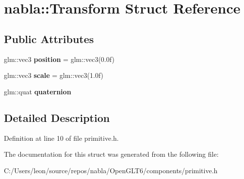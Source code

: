 \hypertarget{structnabla_1_1_transform}{}\section{nabla\+::Transform Struct Reference}
\label{structnabla_1_1_transform}
\subsection*{Public Attributes}
\begin{DoxyCompactItemize}
\item 
\mbox{\label{structnabla_1_1_transform_ad3a3c34aa338713c4615678fb7719f33}} 
glm\+::vec3 {\bfseries position} = glm\+::vec3(0.\+0f)
\item 
\mbox{\label{structnabla_1_1_transform_ad4e900e8b7159c9393806a569d57c87d}} 
glm\+::vec3 {\bfseries scale} = glm\+::vec3(1.\+0f)
\item 
\mbox{\label{structnabla_1_1_transform_af1cd0a349b7a88d71cb0c1a76bdf7ec1}} 
glm\+::quat {\bfseries quaternion}
\end{DoxyCompactItemize}


\subsection{Detailed Description}


Definition at line 10 of file primitive.\+h.



The documentation for this struct was generated from the following file\+:\begin{DoxyCompactItemize}
\item 
C\+:/\+Users/leon/source/repos/nabla/\+Open\+G\+L\+T6/components/primitive.\+h\end{DoxyCompactItemize}
